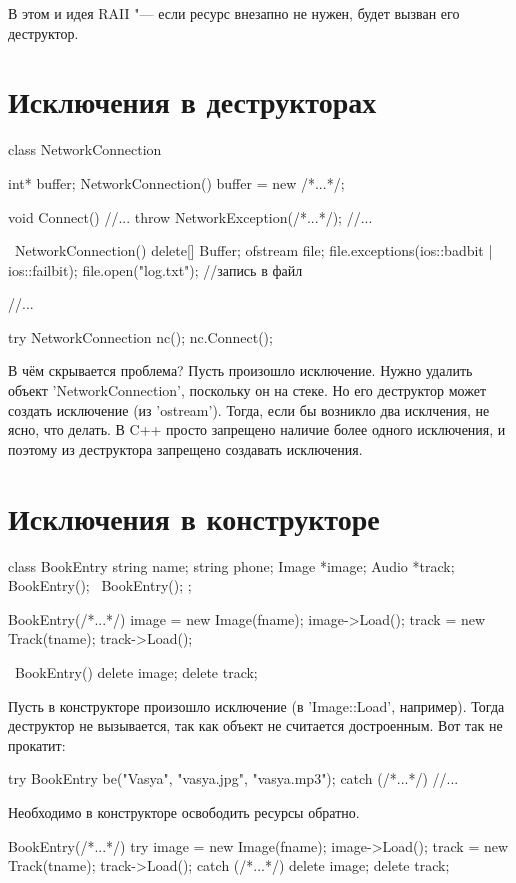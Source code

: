 В этом и идея RAII "--- если ресурс внезапно не нужен, будет вызван его деструктор.

\section{Исключения в деструкторах}

\begin{cppcode}
class NetworkConnection {
	int* buffer;
	NetworkConnection() {
		buffer = new /*...*/;
	}

	void Connect() {
		//...
		throw NetworkException(/*...*/);
		//...
	}

	~NetworkConnection() {
		delete[] Buffer;
		ofstream file;
		file.exceptions(ios::badbit | ios::failbit);
		file.open("log.txt");
		//запись в файл
	}
}

//...

try {
	NetworkConnection nc();
	nc.Connect();
}
\end{cppcode}

В чём скрывается проблема?
Пусть произошло исключение.
Нужно удалить объект \cpp'NetworkConnection', поскольку он на стеке.
Но его деструктор может создать исключение (из \cpp'ostream').
Тогда, если бы возникло два исклчения, не ясно, что делать.
В C++ просто запрещено наличие более одного исключения, и поэтому из деструктора запрещено создавать исключения.

\section{Исключения в конструкторе}

\begin{cppcode}
class BookEntry {
	string name;
	string phone;
	Image *image;
	Audio *track;
	BookEntry();
	~BookEntry();
};

BookEntry(/*...*/) {
	image = new Image(fname);
	image->Load();
	track = new Track(tname);
	track->Load();
}

~BookEntry() {
	delete image;
	delete track;
}
\end{cppcode}

Пусть в конструкторе произошло исключение (в \cpp'Image::Load', например).
Тогда деструктор не вызывается, так как объект не считается достроенным.
Вот так не прокатит:
\begin{cppcode}
try {
	BookEntry be("Vasya", "vasya.jpg", "vasya.mp3");
}
catch (/*...*/) {
	//...
}
\end{cppcode}

Необходимо в конструкторе освободить ресурсы обратно.
\begin{cppcode}
BookEntry(/*...*/) {
	try {
		image = new Image(fname);
		image->Load();
		track = new Track(tname);
		track->Load();
	}
	catch (/*...*/) {
		delete image;
		delete track;
	}
}
\end{cppcode}


